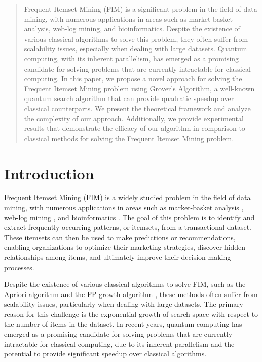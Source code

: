 \begin{abstract}
Frequent Itemset Mining (FIM) is a significant problem in the field of data mining, with numerous applications in areas such as market-basket analysis, web-log mining, and bioinformatics. Despite the existence of various classical algorithms to solve this problem, they often suffer from scalability issues, especially when dealing with large datasets. Quantum computing, with its inherent parallelism, has emerged as a promising candidate for solving problems that are currently intractable for classical computing. In this paper, we propose a novel approach for solving the Frequent Itemset Mining problem using Grover's Algorithm, a well-known quantum search algorithm that can provide quadratic speedup over classical counterparts. We present the theoretical framework and analyze the complexity of our approach. Additionally, we provide experimental results that demonstrate the efficacy of our algorithm in comparison to classical methods for solving the Frequent Itemset Mining problem.
\end{abstract}

\section{Introduction}

Frequent Itemset Mining (FIM) is a widely studied problem in the field of data mining, with numerous applications in areas such as market-basket analysis \cite{agrawal1993mining}, web-log mining \cite{piatetsky1991discovery}, and bioinformatics \cite{creighton2003gene}. The goal of this problem is to identify and extract frequently occurring patterns, or itemsets, from a transactional dataset. These itemsets can then be used to make predictions or recommendations, enabling organizations to optimize their marketing strategies, discover hidden relationships among items, and ultimately improve their decision-making processes.

Despite the existence of various classical algorithms to solve FIM, such as the Apriori algorithm \cite{agrawal1994fast} and the FP-growth algorithm \cite{han2000mining}, these methods often suffer from scalability issues, particularly when dealing with large datasets. The primary reason for this challenge is the exponential growth of search space with respect to the number of items in the dataset. In recent years, quantum computing has emerged as a promising candidate for solving problems that are currently intractable for classical computing, due to its inherent parallelism and the potential to provide significant speedup over classical algorithms.


